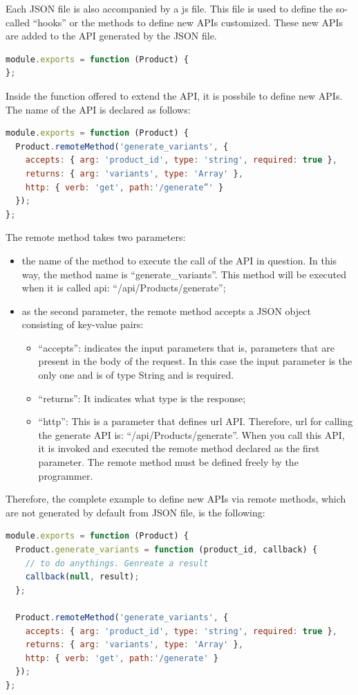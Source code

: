 Each JSON file is also accompanied by a js file. This file is used to define the so-called “hooks” or the methods to define new APIs customized. These new APIs are added to the API generated by the JSON file.
\begin{lstlisting}[language=javascript]
module.exports = function (Product) {
};
\end{lstlisting}
Inside the function offered to extend the API, it is possbile to define new APIs. The name of the API is declared as follows:
\begin{lstlisting}[language=javascript]
module.exports = function (Product) {
  Product.remoteMethod('generate_variants', {
    accepts: { arg: 'product_id', type: 'string', required: true },
    returns: { arg: 'variants', type: 'Array' },
    http: { verb: 'get', path:'/generate”' }
  });
};
\end{lstlisting}
The remote method takes two parameters:
\begin{itemize}
\item the name of the method to execute the call of the API in question. In this way, the method name is “generate\_variants”. This method will be executed when it is called api: “/api/Products/generate”;
\item as the second parameter, the remote method accepts a JSON object consisting of key-value pairs:
\begin{itemize}
\item “accepts”: indicates the input parameters that is, parameters that are present in the body of the request. In this case the input parameter is the only one and is of type String and is required.
\item “returns”: It indicates what type is the response;
\item “http”: This is a parameter that defines url API. Therefore, url for calling the generate API is: “/api/Products/generate”. When you call this API, it is invoked and executed the remote method declared as the first parameter. The remote method must be defined freely by the programmer.
\end{itemize}
\end{itemize}
Therefore, the complete example to define new APIs via remote methods, which are not generated by default from JSON file, is the following:
\begin{lstlisting}[language=javascript]
module.exports = function (Product) {
  Product.generate_variants = function (product_id, callback) {
    // to do anythings. Genreate a result
    callback(null, result);
  };

  Product.remoteMethod('generate_variants', {
    accepts: { arg: 'product_id', type: 'string', required: true },
    returns: { arg: 'variants', type: 'Array' },
    http: { verb: 'get', path:'/generate' }
  });
};
\end{lstlisting}
